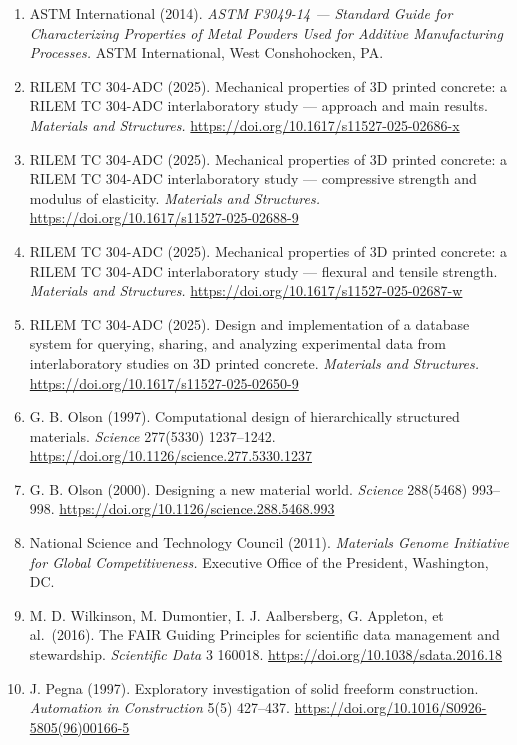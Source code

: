 \documentclass[
  11pt,
  letterpaper,
]{article}
\begin{document}
\begin{enumerate}
  \url{https://doi.org/10.1016/j.cemconres.2021.106559}
\item
  ASTM International (2014). \emph{ASTM F3049-14 --- Standard Guide for
  Characterizing Properties of Metal Powders Used for Additive
  Manufacturing Processes.} ASTM International, West Conshohocken, PA.
\item
  RILEM TC 304-ADC (2025). Mechanical properties of 3D printed concrete:
  a RILEM TC 304-ADC interlaboratory study --- approach and main
  results. \emph{Materials and Structures.}
  \url{https://doi.org/10.1617/s11527-025-02686-x}
\item
  RILEM TC 304-ADC (2025). Mechanical properties of 3D printed concrete:
  a RILEM TC 304-ADC interlaboratory study --- compressive strength and
  modulus of elasticity. \emph{Materials and Structures.}
  \url{https://doi.org/10.1617/s11527-025-02688-9}
\item
  RILEM TC 304-ADC (2025). Mechanical properties of 3D printed concrete:
  a RILEM TC 304-ADC interlaboratory study --- flexural and tensile
  strength. \emph{Materials and Structures.}
  \url{https://doi.org/10.1617/s11527-025-02687-w}
\item
  RILEM TC 304-ADC (2025). Design and implementation of a database
  system for querying, sharing, and analyzing experimental data from
  interlaboratory studies on 3D printed concrete. \emph{Materials and
  Structures.} \url{https://doi.org/10.1617/s11527-025-02650-9}
\item
  G. B. Olson (1997). Computational design of hierarchically structured
  materials. \emph{Science} 277(5330) 1237--1242.
  \url{https://doi.org/10.1126/science.277.5330.1237}
\item
  G. B. Olson (2000). Designing a new material world. \emph{Science}
  288(5468) 993--998. \url{https://doi.org/10.1126/science.288.5468.993}
\item
  National Science and Technology Council (2011). \emph{Materials Genome
  Initiative for Global Competitiveness.} Executive Office of the
  President, Washington, DC.
\item
  M. D. Wilkinson, M. Dumontier, I. J. Aalbersberg, G. Appleton, et
  al.~(2016). The FAIR Guiding Principles for scientific data management
  and stewardship. \emph{Scientific Data} 3 160018.
  \url{https://doi.org/10.1038/sdata.2016.18}
\item
  J. Pegna (1997). Exploratory investigation of solid freeform
  construction. \emph{Automation in Construction} 5(5) 427--437.
  \url{https://doi.org/10.1016/S0926-5805(96)00166-5}

\end{enumerate}
\end{document}
